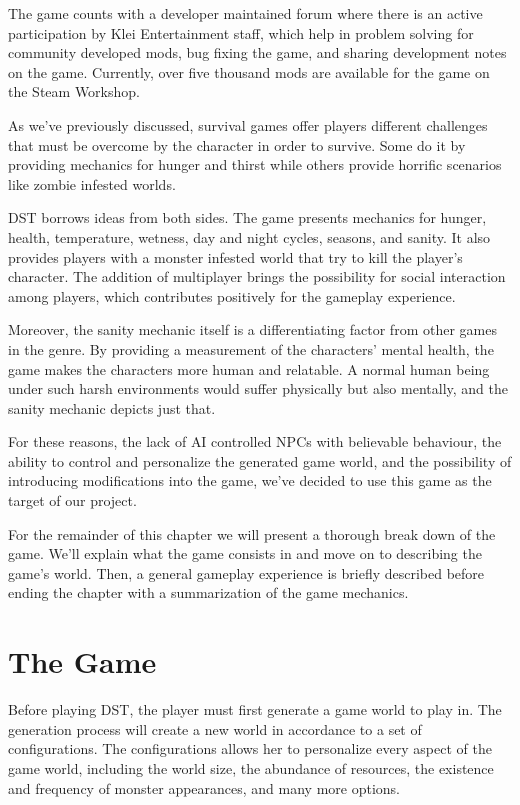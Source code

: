 The game counts with a developer maintained forum where there is an active participation by Klei Entertainment staff, which help in problem solving for community developed mods, bug fixing the game, and sharing development notes on the game.
Currently, over five thousand mods are available for the game on the Steam Workshop.

As we've previously discussed, survival games offer players different challenges that must be overcome by the character in order to survive.
Some do it by providing mechanics for hunger and thirst while others provide horrific scenarios like zombie infested worlds.

\ac{DST} borrows ideas from both sides.
The game presents mechanics for hunger, health, temperature, wetness, day and night cycles, seasons, and sanity.
It also provides players with a monster infested world that try to kill the player's character.
The addition of multiplayer brings the possibility for social interaction among players, which contributes positively for the gameplay experience.

Moreover, the sanity mechanic itself is a differentiating factor from other games in the genre.
By providing a measurement of the characters' mental health, the game makes the characters more human and relatable.
A normal human being under such harsh environments would suffer physically but also mentally, and the sanity mechanic depicts just that.

For these reasons, the lack of \ac{AI} controlled \acp{NPC} with believable behaviour, the ability to control and personalize the generated game world, and the possibility of introducing modifications into the game, we've decided to use this game as the target of our project.

For the remainder of this chapter we will present a thorough break down of the game.
We'll explain what the game consists in and move on to describing the game's world.
Then, a general gameplay experience is briefly described before ending the chapter with a summarization of the game mechanics.

\section{The Game}

\noindent Before playing \ac{DST}, the player must first generate a game world to play in.
The generation process will create a new world in accordance to a set of configurations.
The configurations allows her to personalize every aspect of the game world, including the world size, the abundance of resources, the existence and frequency of monster appearances, and many more options.


